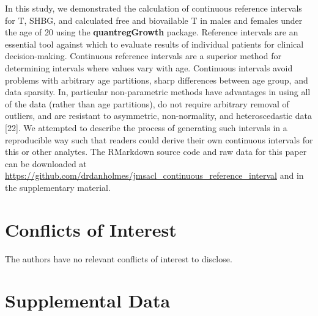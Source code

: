 \documentclass[]{elsarticle} %
\begin{document}
In this study, we demonstrated the calculation of continuous reference
intervals for T, SHBG, and calculated free and biovailable T in males
and females under the age of 20 using the \textbf{quantregGrowth}
package. Reference intervals are an essential tool against which to
evaluate results of individual patients for clinical decision-making.
Continuous reference intervals are a superior method for determining
intervals where values vary with age. Continuous intervals avoid
problems with arbitrary age partitions, sharp differences between age
group, and data sparsity. In, particular non-parametric methods have
advantages in using all of the data (rather than age partitions), do not
require arbitrary removal of outliers, and are resistant to asymmetric,
non-normality, and heteroscedastic data {[}22{]}. We attempted to
describe the process of generating such intervals in a reproducible way
such that readers could derive their own continuous intervals for this
or other analytes. The RMarkdown source code and raw data for this paper
can be downloaded at
\url{https://github.com/drdanholmes/jmsacl_continuous_reference_interval}
and in the supplementary material.

\hypertarget{conflicts-of-interest}{%
\section{Conflicts of Interest}\label{conflicts-of-interest}}

The authors have no relevant conflicts of interest to disclose.

\hypertarget{supplemental-data}{%
\section{Supplemental Data}\label{supplemental-data}}
\end{document}
